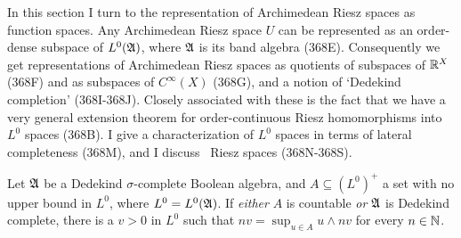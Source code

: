 
\def\chaptername{Function spaces}
\def\sectionname{Embedding Riesz spaces in $L^0$}


In this section I turn to the representation of Archimedean Riesz spaces
as function spaces.   Any Archimedean Riesz space $U$ can be represented
as an order-dense subspace of $L^0(\frak A)$, where $\frak A$ is its
band algebra (368E).   Consequently we get representations of
Archimedean Riesz
spaces as quotients of subspaces of $\Bbb R^X$ (368F) and as subspaces
of $C^{\infty}(X)$ (368G), and a notion of `Dedekind completion'
(368I-368J).   Closely associated with these is the fact that we have a
very general extension theorem for order-continuous Riesz homomorphisms
into $L^0$ spaces (368B).   I give a characterization of $L^0$
spaces in terms of lateral completeness (368M), and I
discuss \wsid\ Riesz spaces (368N-368S).


 Let $\frak A$ be a Dedekind $\sigma$-complete
Boolean algebra, and $A\subseteq(L^0)^+$ a set with no upper bound in
$L^0$, where
$L^0=L^0(\frak A)$.   If {\it either} $A$ is countable {\it or}
$\frak A$ is Dedekind complete, there is a $v>0$ in $L^0$ such that
$nv=\sup_{u\in A}u\wedge nv$ for every $n\in\Bbb N$.


